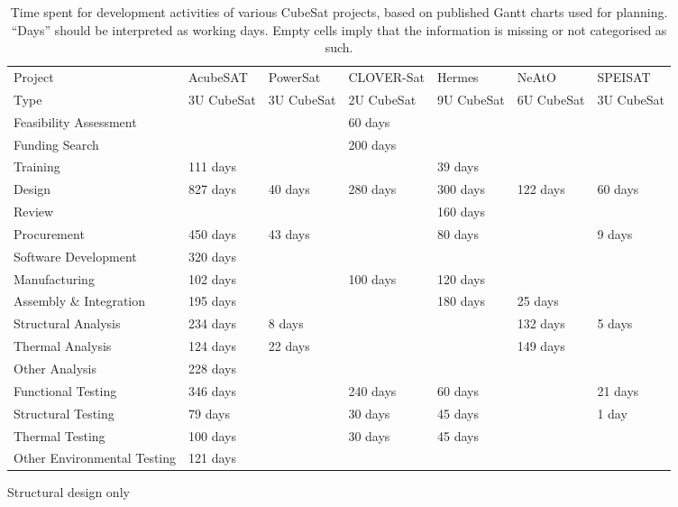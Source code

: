 \documentclass[a4paper,nobib,justified,final]{tufte-book}
\begin{document}
\begin{table}[h]
	\caption[Time spent for development activities of various CubeSat projects]{Time spent for development activities of various CubeSat projects, based on published Gantt charts used for planning. ``Days'' should be interpreted as working days. Empty cells imply that the information is missing or not categorised as such.}
	\label{tab:l_cubesat_time_drivers}
	\begin{threeparttable}
	\begin{adjustbox}{width=1.1\textwidth,center}
	\begin{tabular}{lllllll}
		\hline
		Project & AcubeSAT \cite{papafotiouAcubeSATProjectManagement2021} & PowerSat \cite{garrettProjectManagementSystems2022} & CLOVER-Sat \cite{jeremyjacobeAnnouncementPartnershipOpportunity} & Hermes \cite{pujolgasullaHermesCubesatOnsite2021} & NeAtO \cite{andersonDesignAnalysisCubeSat2020} & SPEISAT \cite{bartolucciStudyAnalysisNanosatellite} \\
		Type & 3U CubeSat & 3U CubeSat & 2U CubeSat & 9U CubeSat & 6U CubeSat & 3U CubeSat \\ \hline
		Feasibility Assessment &  & & 60 days & & & \\
		Funding Search &  & & 200 days & & & \\
		Training & 111 days  & & & 39 days & & \\
		Design & 827 days & 40 days \tnote{1} & 280 days & 300 days & 122 days & 60 days\\
		Review &  &  & & 160 days & &\\
		Procurement & 450 days  & 43 days&  & 80 days & & 9 days\\
		Software Development & 320 days & & & & & \\
		Manufacturing & 102 days & & 100 days & 120 days & & \\
		Assembly \& Integration & 195 days & & & 180 days & 25 days &\\
		Structural Analysis & 234 days & 8 days & & & 132 days & 5 days \\
		Thermal Analysis & 124 days & 22 days &  & & 149 days &\\
		Other Analysis & 228 days &  & & & &\\
		Functional Testing & 346 days &  & 240 days & 60 days & & 21 days\\
		Structural Testing & 79 days &  & 30 days & 45 days & & 1 day\\
		Thermal Testing & 100 days &  & 30 days & 45 days & &\\
		Other Environmental Testing & 121 days & & &  & &\\ \hline
		\end{tabular}
	\end{adjustbox}
	\begin{tablenotes}
		\item[1] Structural design only
	\end{tablenotes}
	\end{threeparttable}
\end{table}
\end{document}

